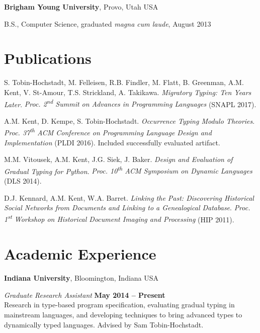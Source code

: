 \documentclass[margin,line]{res}
\newcommand{\ts}{\textsuperscript}
\newenvironment{list1}{
  \begin{list}{\ding{113}}{%
      \setlength{\itemsep}{0in}
      \setlength{\parsep}{0in} \setlength{\parskip}{0in}
      \setlength{\topsep}{0in} \setlength{\partopsep}{0in} 
      \setlength{\leftmargin}{0.17in}}}{\end{list}}
\begin{document}
\begin{resume}
{\bf Brigham Young University}, Provo, Utah USA\\
\vspace*{-.1in}
\begin{list1}
\item[] B.S., Computer Science, graduated \emph{magna cum laude}, August 2013
\end{list1}

\section{\sc Publications}



S. Tobin-Hochstadt, M. Felleisen, R.B. Findler, M. Flatt, B. Greenman,
A.M. Kent, V. St-Amour, T.S. Strickland, A. Takikawa. \emph{Migratory
  Typing: Ten Years Later}. {\em Proc. 2\ts{nd} Summit on Advances in
  Programming Languages} (SNAPL 2017).

A.M. Kent, D. Kempe, S. Tobin-Hochstadt. \emph{Occurrence Typing
  Modulo Theories}. {\em Proc. 37\ts{th} ACM Conference on Programming
  Language Design and Implementation} (PLDI 2016). Included
  successfully evaluated artifact.

M.M. Vitousek, A.M. Kent, J.G. Siek, J. Baker. \emph{Design and
  Evaluation of Gradual Typing for Python}. {\em Proc.  10\ts{th} ACM
    Symposium on Dynamic Languages} (DLS 2014).

D.J. Kennard, A.M. Kent, W.A. Barret. \emph{Linking the Past:
  Discovering Historical Social Networks from Documents and Linking to
  a Genealogical Database}. {\em Proc. 1\ts{st} Workshop on Historical
  Document Imaging and Processing} (HIP 2011).

%

\section{\sc Academic Experience}
{\bf Indiana University}, Bloomington, Indiana USA

\vspace{-.3cm}
{\em Graduate Research Assistant} \hfill {\bf May 2014 -- Present}\\
Research in type-based program specification, evaluating gradual
typing in mainstream languages, and developing techniques
to bring advanced types to dynamically typed languages. Advised by
Sam Tobin-Hochstadt.


\end{resume}
\end{document}
